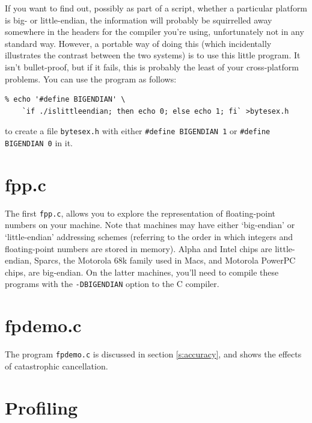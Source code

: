 \documentclass[11pt,oneside,chapters]{starlink}
\begin{document}
If you want to find out, possibly as part of a script,
whether a particular platform is big- or little-endian,
the information will probably be squirrelled away
somewhere in the headers for the compiler you're using,
unfortunately not in any standard way.  However, a
portable way of doing this (which incidentally illustrates
the contrast between the two systems) is to use this
little program.  It isn't bullet-proof, but if it fails,
this is probably the least of your cross-platform
problems.  You can use the program as follows:

\begin{verbatim}
% echo '#define BIGENDIAN' \
    `if ./islittleendian; then echo 0; else echo 1; fi` >bytesex.h
\end{verbatim}

to create a file \texttt{bytesex.h} with either \texttt{\#define BIGENDIAN 1}
or \texttt{\#define BIGENDIAN 0} in it.



\section{fpp.c}
\label{a:fpp:c}


The first \texttt{fpp.c}, allows you to explore the representation of
floating-point numbers on your machine.  Note that machines may have
either `big-endian' or `little-endian' addressing schemes (referring
to the order in which integers and floating-point numbers are stored
in memory).  Alpha and Intel chips are little-endian, Sparcs, the
Motorola 68k family used in Macs, and Motorola PowerPC chips, are
big-endian.  On the latter machines, you'll need to compile these
programs with the \texttt{-DBIGENDIAN} option to the C compiler.



\section{fpdemo.c}
\label{a:fpdemo:c}

The program \texttt{fpdemo.c} is discussed in
section \ref{s:accuracy}, and shows the effects of catastrophic
cancellation.



\section{Profiling}
\label{a:profiling}
\end{document}
